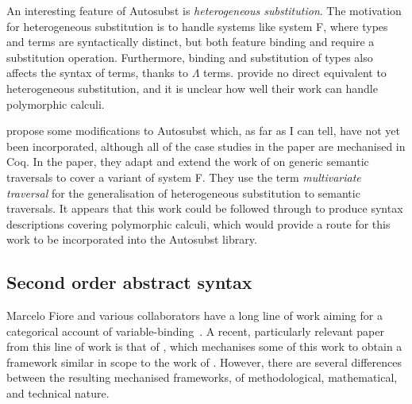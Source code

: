 An interesting feature of Autosubst is \emph{heterogeneous substitution}.
The motivation for heterogeneous substitution is to handle systems like system
F, where types and terms are syntactically distinct, but both feature binding
and require a substitution operation.
Furthermore, binding and substitution of types also affects the syntax of terms,
thanks to $\Lambda$ terms.
\citeauthor{AACMM21} provide no direct equivalent to heterogeneous substitution,
and it is unclear how well their work can handle polymorphic calculi.

\citet{Autosubst18} propose some modifications to Autosubst which, as far as I
can tell, have not yet been incorporated, although all of the case studies in
the paper are mechanised in Coq.
In the paper, they adapt and extend the work of \citeauthor{ACMM17} on generic
semantic traversals to cover a variant of system F.
They use the term \emph{multivariate traversal} for the generalisation of
heterogeneous substitution to semantic traversals.
It appears that this work could be followed through to produce syntax
descriptions covering polymorphic calculi, which would provide a route for this
work to be incorporated into the Autosubst library.

\subsection{Second order abstract syntax}\label{sec:fiore}

Marcelo Fiore and various collaborators have a long line of work aiming for a
categorical account of variable-binding~\citep{FPT99,Fiore08,FH13,FH10,FM10}.
A recent, particularly relevant paper from this line of work is that of
\citet{FS22}, which mechanises some of this work to obtain a framework similar
in scope to the work of \citet{AACMM21}.
However, there are several differences between the resulting mechanised
frameworks, of methodological, mathematical, and technical nature.

